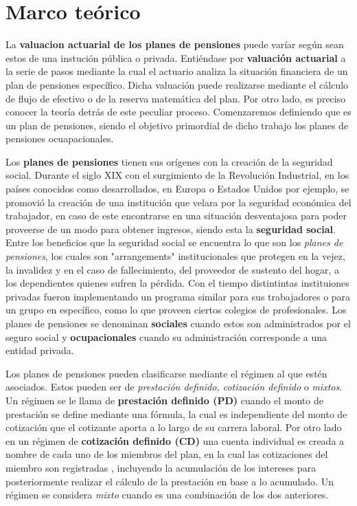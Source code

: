 \documentclass[12pt,letterpaper,titlepage]{article}
\begin{document}
\section{Marco teórico}

La \textbf{valuacion actuarial de los planes de pensiones} puede varíar según sean estos de una instución pública o privada. Entiéndase por \textbf{valuación actuarial} a la serie de pasos mediante la cual el actuario analiza la situación financiera de un plan de pensiones específico. Dicha valuación puede realizarse mediante el cálculo de flujo de efectivo o de la reserva matemática del plan. Por otro lado, es preciso conocer la teoría detrás de este peculiar proceso. Comenzaremos definiendo que es un plan de pensiones, siendo el objetivo primordial de dicho trabajo los planes de pensiones ocuapacionales. 

Los \textbf{planes de pensiones} tienen sus orígenes con la creación de la seguridad social. Durante el siglo XIX con el surgimiento de la Revolución Industrial, en los países conocidos como desarrollados, en Europa o Estados Unidos por ejemplo,  se promovió la creación de una institución que velara por la seguridad económica del trabajador, en caso de este encontrarse en una situación desventajosa para poder proveerse de un modo para obtener ingresos, siendo esta la \textbf{seguridad social}. Entre los beneficios que la seguridad social se encuentra lo que son los \textit{planes de pensiones}, los cuales son "arrangements" institucionales que protegen en la vejez, la invalidez y en el caso de fallecimiento, del proveedor de sustento del hogar, a los dependientes quienes sufren la pérdida. Con el tiempo distintintas instituiones privadas fueron implementando un programa similar para sus trabajadores o para un grupo en específico, como lo que proveen ciertos colegios de profesionales. Los planes de pensiones se denominan \textbf{sociales} cuando estos son administrados por el seguro social y \textbf{ocupacionales} cuando su administración corresponde a una entidad privada.

Los planes de pensiones pueden clasificarse mediante el régimen al que estén asociados. Estos pueden ser de \textit{prestación definido,  cotización definido} o \textit{mixtos}. Un régimen se le llama de \textbf{prestación definido (PD)} cuando el monto de prestación se define mediante una fórmula, la cual es independiente del monto de cotización que el cotizante aporta a lo largo de su carrera laboral. Por otro lado en un régimen de \textbf{cotización definido (CD)} una cuenta individual es creada a nombre de cada uno de los miembros del plan, en la cual las cotizaciones del miembro son registradas \cite{778}, incluyendo la acumulación de los intereses para posteriormente realizar el cálculo de la prestación en base a lo acumulado. Un régimen se considera \textit{mixto} cuando es una combinación de los dos anteriores. 
\end{document}
